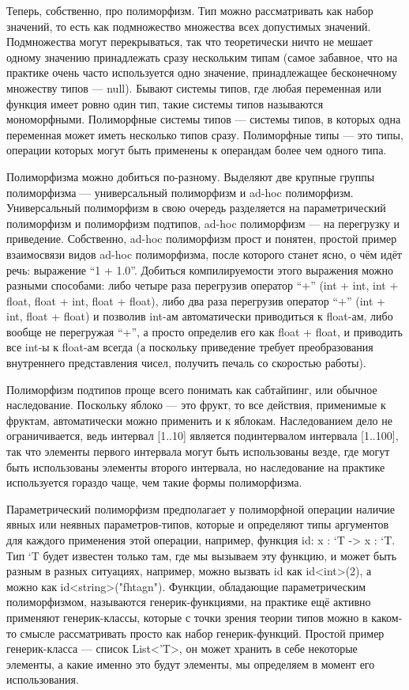 \documentclass[a5paper]{article}
\begin{document}
Теперь, собственно, про полиморфизм. Тип можно рассматривать как набор значений, то есть как подмножество множества всех допустимых значений. Подмножества могут перекрываться, так что теоретически ничто не мешает одному значению принадлежать сразу нескольким типам (самое забавное, что на практике очень часто используется одно значение, принадлежащее бесконечному множеству типов --- null). Бывают системы типов, где любая переменная или функция имеет ровно один тип, такие системы типов называются мономорфными. Полиморфные системы типов --- системы типов, в которых одна переменная может иметь несколько типов сразу. Полиморфные типы --- это типы, операции которых могут быть применены к операндам более чем одного типа.

Полиморфизма можно добиться по-разному. Выделяют две крупные группы полиморфизма --- универсальный полиморфизм и ad-hoc полиморфизм. Универсальный полиморфизм в свою очередь разделяется на параметрический полиморфизм и полиморфизм подтипов, ad-hoc полиморфизм --- на перегрузку и приведение. Собственно, ad-hoc полиморфизм прост и понятен, простой пример взаимосвязи видов ad-hoc полиморфизма, после которого станет ясно, о чём идёт речь: выражение ``1 + 1.0''. Добиться компилируемости этого выражения можно разными способами: либо четыре раза перегрузив оператор ``+'' (int + int, int + float, float + int, float + float), либо два раза перегрузив оператор ``+'' (int + int, float + float) и позволив int-ам автоматически приводиться к float-ам, либо вообще не перегружая ``+'', а просто определив его как float + float, и приводить все int-ы к float-ам всегда (а поскольку приведение требует преобразования внутреннего представления чисел, получить печаль со скоростью работы).

Полиморфизм подтипов проще всего понимать как сабтайпинг, или обычное наследование. Поскольку яблоко --- это фрукт, то все действия, применимые к фруктам, автоматически можно применить и к яблокам. Наследованием дело не ограничивается, ведь интервал [1..10] является подинтервалом интервала [1..100], так что элементы первого интервала могут быть использованы везде, где могут быть использованы элементы второго интервала, но наследование на практике используется гораздо чаще, чем такие формы полиморфизма. 

Параметрический полиморфизм предполагает у полиморфной операции наличие явных или неявных параметров-типов, которые и определяют типы аргументов для каждого применения этой операции, например, функция id: x : ‘T -> x : ‘T. Тип ‘T будет известен только там, где мы вызываем эту функцию, и может быть разным в разных ситуациях, например, можно вызвать id как id<int>(2), а можно как id<string>("fhtagn"). Функции, обладающие параметрическим полиморфизмом, называются генерик-функциями, на практике ещё активно применяют генерик-классы, которые с точки зрения теории типов можно в каком-то смысле рассматривать просто как набор генерик-функций. Простой пример генерик-класса --- список List<’T>, он может хранить в себе некоторые элементы, а какие именно это будут элементы, мы определяем в момент его использования.
\end{document}
